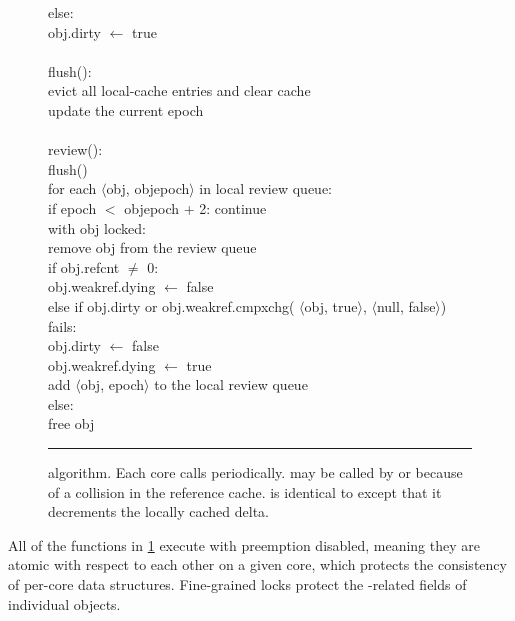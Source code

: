 \begin{figure}
\begin{tabbing}
          else: \+\\
            obj.dirty $\gets$ true \\
    \-\-\-\-\\[\fgap]
    flush(): \+\\
      evict all local-cache entries and clear cache \\
      update the current epoch \\
    \-\\[\fgap]
    review(): \+\\
      flush() \\
      for each $\langle$obj, objepoch$\rangle$ in local review queue: \+\\
        if epoch $<$ objepoch + 2: continue \\
        with obj locked: \+\\
          remove obj from the review queue \\
          if obj.refcnt $\ne$ 0: \+\\
            obj.weakref.dying $\gets$ false \-\\
          else if obj.dirty or obj.weakref.cmpxchg(%
                $\langle$obj, true$\rangle$,
                $\langle$null, false$\rangle$) fails: \+\\
            obj.dirty $\gets$ false \\
            obj.weakref.dying $\gets$ true \\
            add $\langle$obj, epoch$\rangle$ to the local review queue \-\\
          else: \+\\
            free obj
  \end{tabbing}
  \vspace{-1em}                 %
  \rule{\columnwidth}{0.5pt}
  \vspace{-\baselineskip}
  \caption[ algorithm.]
  { algorithm.  Each core calls 
    periodically.   may be called by  or because of a
    collision in the reference cache.   is identical to  except
    that it decrements the locally cached delta.}
  \label{fig:refcache-code}
\end{figure}

All of the functions in \cref{fig:refcache-code} execute with
preemption disabled, meaning they are atomic with respect to each
other on a given core, which protects the consistency of per-core data
structures.  Fine-grained locks protect the -related fields
of individual objects.


